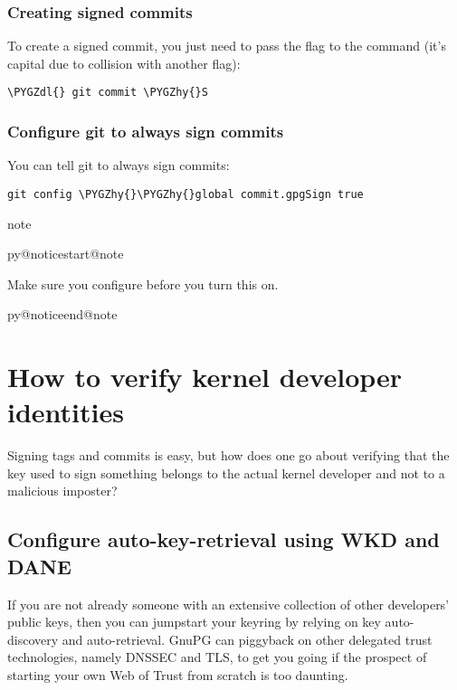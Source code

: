 \documentclass[a4paper,8pt,english]{sphinxmanual}
\makeatletter
\renewenvironment{notice}[2]{%
          \def\py@noticetype{#1}
          \begin{coloredbox}{#1}
          \bf\it
          \par\strong{#2}
          \csname py@noticestart@#1\endcsname
        }
	{
          \csname py@noticeend@\py@noticetype\endcsname
          \end{coloredbox}
        }
\def\PYGZdl{\char`\$}
\def\PYGZhy{\char`\-}
\makeatother
\begin{document}
\subsubsection{Creating signed commits}
\label{process/maintainer-pgp-guide:creating-signed-commits}
To create a signed commit, you just need to pass the  flag to the
 command (it's capital  due to collision with
another flag):

\begin{Verbatim}[commandchars=\\\{\}]
\PYGZdl{} git commit \PYGZhy{}S
\end{Verbatim}


\subsubsection{Configure git to always sign commits}
\label{process/maintainer-pgp-guide:configure-git-to-always-sign-commits}
You can tell git to always sign commits:

\begin{Verbatim}[commandchars=\\\{\}]
git config \PYGZhy{}\PYGZhy{}global commit.gpgSign true
\end{Verbatim}

\begin{notice}{note}{Note:}
Make sure you configure  before you turn this on.
\end{notice}


\section{How to verify kernel developer identities}
\label{process/maintainer-pgp-guide:how-to-verify-kernel-developer-identities}\label{process/maintainer-pgp-guide:verify-identities}
Signing tags and commits is easy, but how does one go about verifying
that the key used to sign something belongs to the actual kernel
developer and not to a malicious imposter?


\subsection{Configure auto-key-retrieval using WKD and DANE}
\label{process/maintainer-pgp-guide:configure-auto-key-retrieval-using-wkd-and-dane}
If you are not already someone with an extensive collection of other
developers' public keys, then you can jumpstart your keyring by relying
on key auto-discovery and auto-retrieval. GnuPG can piggyback on other
delegated trust technologies, namely DNSSEC and TLS, to get you going if
the prospect of starting your own Web of Trust from scratch is too
daunting.
\end{document}

